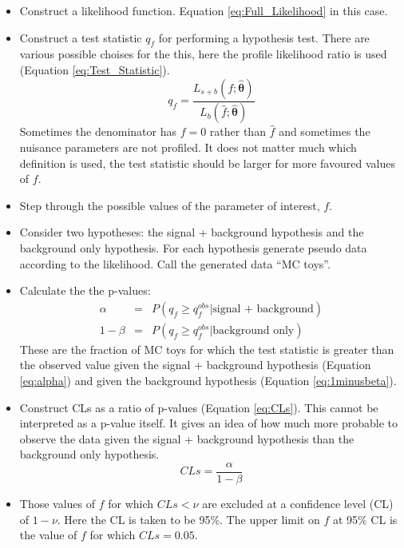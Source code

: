 \begin{itemize}
\item Construct a likelihood function. Equation \ref{eq:Full_Likelihood} in this 
case.
\item Construct a test statistic $q_{f}$ for performing a hypothesis test. There 
are various possible choises for the this, here the profile likelihood ratio is
used (Equation \ref{eq:Test_Statistic}).
\begin{equation}
q_{f} =
\frac{L_{s+b}(f;\hat{\boldsymbol\theta})}{L_{b}(\hat{f};\hat{\boldsymbol\theta})}
\label{eq:Test_Statistic}
\end{equation}
Sometimes the denominator has $f = 0$ rather than $\hat{f}$ and sometimes the
nuisance parameters are not profiled. It does not matter much which definition
is used, the test statistic should be larger for more favoured values of $f$.  
\item Step through the possible values of the parameter of interest, $f$.
\item Consider two hypotheses: the signal + background hypothesis and the
background only hypothesis. For each hypothesis generate pseudo data according 
to the likelihood. Call the generated data ``MC toys''.
\item Calculate the the p-values:
\begin{eqnarray}
\alpha &=& P(q_f \geq q_f^{obs}|\mbox{signal + background}) \label{eq:alpha} \\
1-\beta &=& P(q_f \geq q_f^{obs}|\mbox{background only}) \label{eq:1minusbeta}
\end{eqnarray}
These are the fraction of MC toys for which the test statistic is greater than
the observed value given the signal + background hypothesis (Equation
\ref{eq:alpha}) and given the background hypothesis (Equation 
\ref{eq:1minusbeta}).
\item Construct CLs as a ratio of p-values (Equation \ref{eq:CLs}). This cannot 
be interpreted as a p-value itself. It gives an idea of how much more probable 
to observe the data given the signal + background hypothesis than the background 
only hypothesis.
\begin{equation}
CLs = \frac{\alpha}{1-\beta}
\label{eq:CLs}
\end{equation}
\item Those values of $f$ for which $CLs < \nu$ are excluded at a confidence
level (CL) of $1-\nu$. Here the CL is taken to be 95\%. The upper limit on $f$ 
at 95\% CL is the value of $f$ for which $CLs = 0.05$.
\end{itemize}

